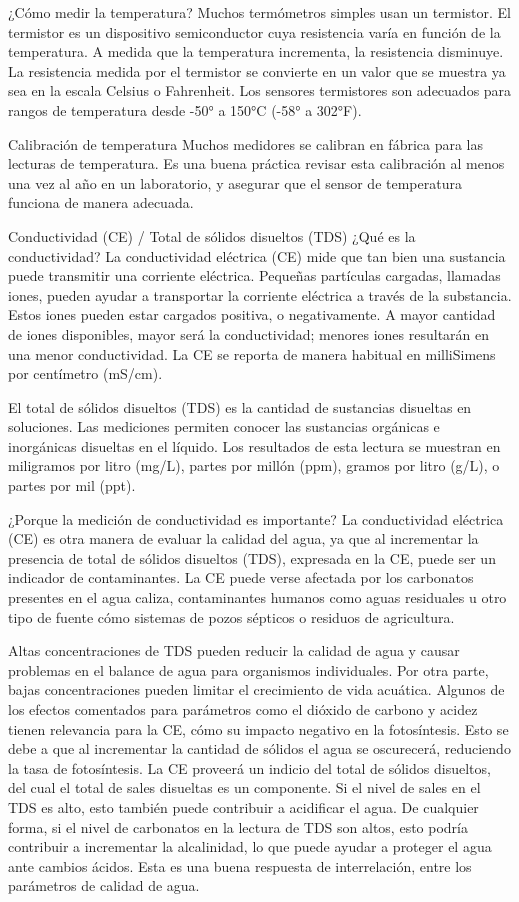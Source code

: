 ¿Cómo medir la temperatura?
Muchos termómetros simples usan un termistor.  El termistor es un dispositivo semiconductor cuya resistencia varía en función de la temperatura.  A medida que la temperatura incrementa, la resistencia disminuye.  La resistencia medida por el termistor se convierte en un valor que se muestra ya sea en la escala Celsius o Fahrenheit.  Los sensores termistores son adecuados para rangos de temperatura desde -50° a 150°C (-58° a 302°F).

Calibración de temperatura
Muchos medidores se calibran en fábrica para las lecturas de temperatura. Es una buena práctica revisar esta calibración al menos una vez al año en un laboratorio, y asegurar que el sensor de temperatura funciona de manera adecuada.

Conductividad (CE) / Total de sólidos disueltos (TDS)
¿Qué es la conductividad?
La conductividad eléctrica (CE) mide que tan bien una sustancia puede transmitir una corriente eléctrica. Pequeñas partículas cargadas, llamadas iones, pueden ayudar a transportar la corriente eléctrica a través de la substancia. Estos iones pueden estar cargados positiva, o negativamente. A mayor cantidad de iones disponibles, mayor será la conductividad; menores iones resultarán en una menor conductividad. La CE se reporta de manera habitual en milliSimens por centímetro (mS/cm).

El total de sólidos disueltos (TDS) es la cantidad de sustancias disueltas en soluciones. Las mediciones permiten conocer las sustancias orgánicas e inorgánicas disueltas en el líquido. Los resultados de esta lectura se muestran en miligramos por litro (mg/L), partes por millón (ppm), gramos por litro (g/L), o partes por mil (ppt).

¿Porque la medición de conductividad es importante?
La conductividad eléctrica (CE) es otra manera de evaluar la calidad del agua, ya que al incrementar la presencia de total de sólidos disueltos (TDS), expresada en la CE, puede ser un indicador de contaminantes. La CE puede verse afectada por los carbonatos presentes en el agua caliza, contaminantes humanos como aguas residuales u otro tipo de fuente cómo sistemas de pozos sépticos o residuos de agricultura.

Altas concentraciones de TDS pueden reducir la calidad de agua y causar problemas en el balance de agua para organismos individuales. Por otra parte, bajas concentraciones pueden limitar el crecimiento de vida acuática. Algunos de los efectos comentados para parámetros como el dióxido de carbono y acidez tienen relevancia para la CE, cómo su impacto negativo en la fotosíntesis. Esto se debe a que al incrementar la cantidad de sólidos el agua se oscurecerá, reduciendo la tasa de fotosíntesis. La CE proveerá un indicio del total de sólidos disueltos, del cual el total de sales disueltas es un componente. Si el nivel de sales en el TDS es alto, esto también puede contribuir a acidificar el agua. De cualquier forma, si el nivel de carbonatos en la lectura de TDS son altos, esto podría contribuir a incrementar la alcalinidad, lo que puede ayudar a proteger el agua ante cambios ácidos. Esta es una buena respuesta de interrelación, entre los parámetros de calidad de agua.


